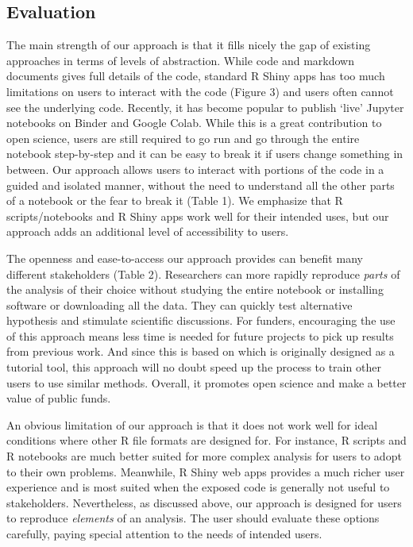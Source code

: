 \hypertarget{evaluation}{%
\subsection{Evaluation}\label{evaluation}}

The main strength of our approach is that it fills nicely the gap of
existing approaches in terms of levels of abstraction. While code and
markdown documents gives full details of the code, standard R Shiny apps
has too much limitations on users to interact with the code (Figure 3)
and users often cannot see the underlying code. Recently, it has become
popular to publish `live' Jupyter notebooks on Binder and Google Colab.
While this is a great contribution to open science, users are still
required to go run and go through the entire notebook step-by-step and
it can be easy to break it if users change something in between. Our
approach allows users to interact with portions of the code in a guided
and isolated manner, without the need to understand all the other parts
of a notebook or the fear to break it (Table 1). We emphasize that R
scripts/notebooks and R Shiny apps work well for their intended uses,
but our approach adds an additional level of accessibility to users.

The openness and ease-to-access our approach provides can benefit many
different stakeholders (Table 2). Researchers can more rapidly reproduce
\emph{parts} of the analysis of their choice without studying the entire
notebook or installing software or downloading all the data. They can
quickly test alternative hypothesis and stimulate scientific
discussions. For funders, encouraging the use of this approach means
less time is needed for future projects to pick up results from previous
work. And since this is based on  which is originally
designed as a tutorial tool, this approach will no doubt speed up the
process to train other users to use similar methods. Overall, it
promotes open science and make a better value of public funds.

An obvious limitation of our approach is that it does not work well for
ideal conditions where other R file formats are designed for. For
instance, R scripts and R notebooks are much better suited for more
complex analysis for users to adopt to their own problems. Meanwhile, R
Shiny web apps provides a much richer user experience and is most suited
when the exposed code is generally not useful to stakeholders.
Nevertheless, as discussed above, our approach is designed for users to
reproduce \emph{elements} of an analysis. The user should evaluate these
options carefully, paying special attention to the needs of intended
users.

